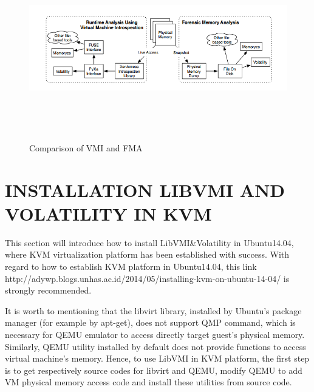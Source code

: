 \begin{figure}[htbp]
	\centering
		\includegraphics[width=14cm, height= 8cm ]{Figures/Figure20.png}
	\caption[Comparison of VMI and FMA]{Comparison of VMI and FMA \cite{Reference3}}
	\label{fig:Comparison of VMI and FMA}
\end{figure}

\section{INSTALLATION LIBVMI AND VOLATILITY IN KVM}
This section will introduce how to install LibVMI\&Volatility in Ubuntu14.04, where KVM virtualization platform has been 
established with success. With regard to how to establish KVM platform in Ubuntu14.04, this link 
http://adywp.blogs.unhas.ac.id/2014/05/installing-kvm-on-ubuntu-14-04/ is strongly recommended.

It is worth to mentioning that the libvirt library, installed by Ubuntu's package manager (for example by apt-get), 
does not support QMP command, which is necessary for QEMU emulator to access directly target guest's physical memory. 
Similarly, QEMU utility installed by default does not provide functions to access virtual machine's memory. Hence, 
to use LibVMI in KVM platform, the first step is to get respectively source codes for libvirt and QEMU, modify QEMU to add 
VM physical memory access code and install these utilities from source code.

